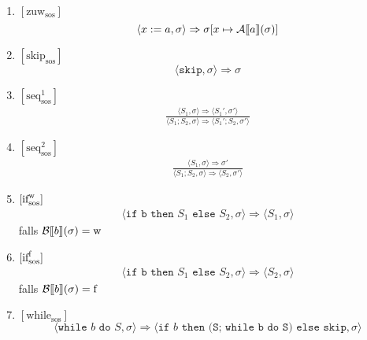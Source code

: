 \begin{enumerate}
    \item $[\text{zuw}_{\text{sos}}]$
    \[
    \langle x := a, \sigma \rangle \Rightarrow \sigma[x \mapsto \mathcal{A}\mathrm{[}\kern-.14em\mathrm{[} a\mathrm{]}\kern-.14em\mathrm{]}(\sigma)]
    \]

    \item $[\text{skip}_{\text{sos}}]$
    \[
    \langle \texttt{skip}, \sigma \rangle \Rightarrow \sigma
    \]

    \item $[\text{seq}_{\text{sos}}^1]$
    \begin{align*}
        \frac{
            \langle S_1, \sigma \rangle \Rightarrow \langle S_1', \sigma' \rangle
        }{
            \langle S_1; S_2, \sigma \rangle \Rightarrow \langle S_1'; S_2, \sigma' \rangle
        }
    \end{align*}

    \item $[\text{seq}_{\text{sos}}^2]$
    \begin{align*}
        \frac{
            \langle S_1, \sigma \rangle \Rightarrow \sigma'
        }{
            \langle S_1; S_2, \sigma \rangle \Rightarrow \langle S_2, \sigma' \rangle
        }
    \end{align*}


    \item $[\text{if}_{\text{sos}}^{\operatorname{w}}]$
    \begin{align*}
        \langle \texttt{if b then } S_1 \texttt{ else } S_2, \sigma \rangle \Rightarrow \langle S_1, \sigma \rangle
    \end{align*}
    falls $\mathcal{B}\mathrm{[}\kern-.14em\mathrm{[} b\mathrm{]}\kern-.14em\mathrm{]}(\sigma) = \operatorname{w}$

    \item $[\text{if}_{\text{sos}}^{\operatorname{f}}]$
    \begin{align*}
        \langle \texttt{if b then } S_1 \texttt{ else } S_2, \sigma \rangle \Rightarrow \langle S_2, \sigma \rangle
    \end{align*}
    falls $\mathcal{B}\mathrm{[}\kern-.14em\mathrm{[} b\mathrm{]}\kern-.14em\mathrm{]}(\sigma) = \operatorname{f}$

    \item $[\text{while}_{\text{sos}}]$
    \[
    \langle \texttt{while } b \texttt{ do } S, \sigma \rangle \Rightarrow \langle \texttt{if } b \texttt{ then } \texttt{(S; while b do S)} \texttt{ else skip}, \sigma \rangle
    \]
\end{enumerate}

